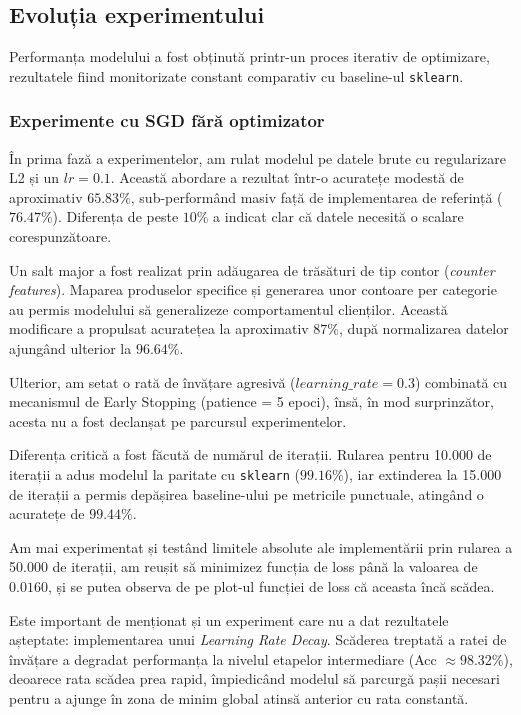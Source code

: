 \documentclass[12pt,a4paper]{article}
\begin{document}
\subsection{Evoluția experimentului}

Performanța modelului a fost obținută printr-un proces iterativ de optimizare, rezultatele fiind monitorizate constant comparativ cu baseline-ul \texttt{sklearn}.

\subsubsection*{Experimente cu SGD fără optimizator}

În prima fază a experimentelor, am rulat modelul pe datele brute cu regularizare L2 și un $lr=0.1$. Această abordare a rezultat într-o acuratețe modestă de aproximativ $65.83\%$, sub-performând masiv față de implementarea de referință ($76.47\%$). Diferența de peste $10\%$ a indicat clar că datele necesită o scalare corespunzătoare.

Un salt major a fost realizat prin adăugarea de trăsături de tip contor (\textit{counter features}). Maparea produselor specifice și generarea unor contoare per categorie au permis modelului să generalizeze comportamentul clienților. Această modificare a propulsat acuratețea la aproximativ $87\%$, după normalizarea datelor ajungând ulterior la $96.64\%$.

Ulterior, am setat o rată de învățare agresivă ($learning\_rate = 0.3$) combinată cu mecanismul de Early Stopping (patience = 5 epoci), însă, în mod surprinzător, acesta nu a fost declanșat pe parcursul experimentelor. 

Diferența critică a fost făcută de numărul de iterații. Rularea pentru 10.000 de iterații a adus modelul la paritate cu \texttt{sklearn} ($99.16\%$), iar extinderea la 15.000 de iterații a permis depășirea baseline-ului pe metricile punctuale, atingând o acuratețe de $99.44\%$.

Am mai experimentat și testând limitele absolute ale implementării prin rularea a 50.000 de iterații, am reușit să minimizez funcția de loss până la valoarea de $0.0160$, și se putea observa de pe plot-ul funcției de loss că aceasta încă scădea.

Este important de menționat și un experiment care nu a dat rezultatele așteptate: implementarea unui \textit{Learning Rate Decay}. Scăderea treptată a ratei de învățare a degradat performanța la nivelul etapelor intermediare (Acc $\approx 98.32\%$), deoarece rata scădea prea rapid, împiedicând modelul să parcurgă pașii necesari pentru a ajunge în zona de minim global atinsă anterior cu rata constantă.
\end{document}
